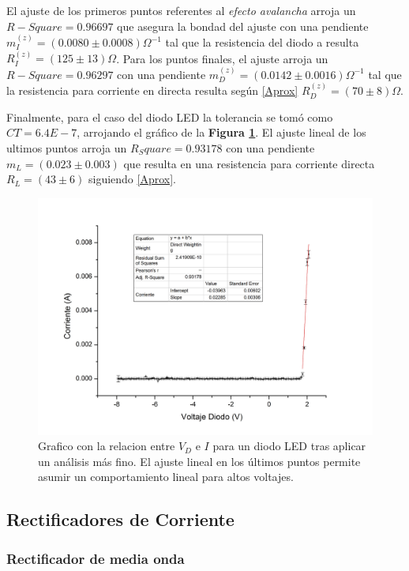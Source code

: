 \documentclass[11pt,a4paper]{article}
\begin{document}
El ajuste de los primeros puntos referentes al \textit{efecto avalancha} arroja un $R-Square = 0.96697$ que asegura la bondad del ajuste con una pendiente $m_I^{(z)} = (0.0080 \pm 0.0008)\Omega^{-1}$ tal que la resistencia del diodo a resulta $R_I^{(z)} = (125 \pm 13)\Omega$. Para los puntos finales, el ajuste arroja un $R-Square = 0.96297$ con una pendiente $m_D^{(z)} = (0.0142 \pm 0.0016)\Omega^{-1}$ tal que la resistencia para corriente en directa resulta según \eqref{Aprox} $R_D^{(z)} = (70 \pm 8)\Omega$.

Finalmente, para el caso del diodo LED la tolerancia se tomó como $CT = 6.4E-7$, arrojando el gráfico de la \textbf{Figura \ref{fig:LED}}. El ajuste lineal de los ultimos puntos arroja un $R_Square = 0.93178$ con una pendiente $m_L = (0.023 \pm 0.003)$ que resulta en una resistencia para corriente directa $R_L = (43 \pm 6)$ siguiendo \eqref{Aprox}.

\begin{figure}[H]
\centering
\includegraphics[scale=0.36]{LED}
   \caption{Grafico con la relacion entre $V_D$ e $I$ para un diodo LED tras aplicar un análisis más fino. El ajuste lineal en los últimos puntos permite asumir un comportamiento lineal para altos voltajes.}
   \label{fig:LED}
\end{figure}



\subsection{Rectificadores de Corriente}



\subsubsection{Rectificador de media onda}
\end{document}
